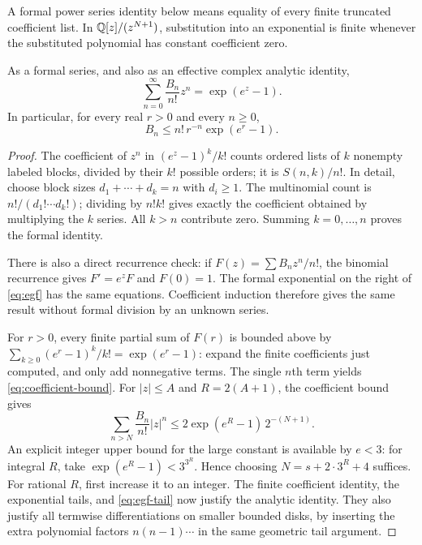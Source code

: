 A formal power series identity below means equality of every finite truncated
coefficient list.  In $\mathbb Q[z]/(z^{N+1})$, substitution into an exponential is
finite whenever the substituted polynomial has constant coefficient zero.

\begin{theorem}\label{thm:egf}
As a formal series, and also as an effective complex analytic identity,
\begin{equation}\label{eq:egf}
 \sum_{n=0}^{\infty}\frac{B_n}{n!}z^n=\exp(e^z-1).
\end{equation}
In particular, for every real $r>0$ and every $n\ge0$,
\begin{equation}\label{eq:coefficient-bound}
 B_n\le n!\,r^{-n}\exp(e^r-1).
\end{equation}
\end{theorem}
\begin{proof}
The coefficient of $z^n$ in $(e^z-1)^k/k!$ counts ordered lists of $k$
nonempty labeled blocks, divided by their $k!$ possible orders; it is
$S(n,k)/n!$.  In detail, choose block sizes
$d_1+\cdots+d_k=n$ with $d_i\ge1$.  The multinomial count is
$n!/(d_1!\cdots d_k!)$; dividing by $n!k!$ gives exactly the coefficient
obtained by multiplying the $k$ series.  All $k>n$ contribute zero.
Summing $k=0,\ldots,n$ proves the formal identity.

There is also a direct recurrence check: if $F(z)=\sum B_nz^n/n!$, the
binomial recurrence gives $F'=e^zF$ and $F(0)=1$.  The formal exponential on
the right of \eqref{eq:egf} has the same equations.  Coefficient induction
therefore gives the same result without formal division by an unknown series.

For $r>0$, every finite partial sum of $F(r)$ is bounded above by
$\sum_{k\ge0}(e^r-1)^k/k!=\exp(e^r-1)$: expand the finite coefficients just
computed, and only add nonnegative terms.  The single $n$th term yields
\eqref{eq:coefficient-bound}.  For $|z|\le A$ and $R=2(A+1)$, the coefficient
bound gives
\begin{equation}\label{eq:egf-tail}
 \sum_{n>N}\frac{B_n}{n!}|z|^n
 \le 2\exp(e^R-1)\,2^{-(N+1)}.
\end{equation}
An explicit integer upper bound for the large constant is available by
$e<3$: for integral $R$, take
$\exp(e^R-1)<3^{3^R}$.  Hence choosing
$N=s+2\cdot3^R+4$ suffices.  For rational $R$, first increase it to an integer.
The finite coefficient identity, the exponential tails, and
\eqref{eq:egf-tail} now justify the analytic identity.  They also justify all
termwise differentiations on smaller bounded disks, by inserting the extra
polynomial factors $n(n-1)\cdots$ in the same geometric tail argument.
\end{proof}

